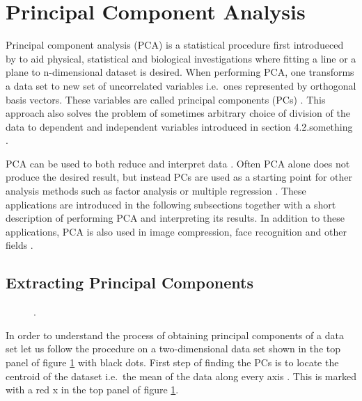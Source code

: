 \documentclass[english, oneside]{HYgradu}
\begin{document}


\section{Principal Component Analysis}
\reversemarginpar
{}
Principal component analysis (PCA) is a statistical procedure first introdueced by \citet{pearson1901lines} to aid physical, statistical and biological investigations where fitting a line or a plane to n-dimensional dataset is desired. When performing PCA, one transforms a data set to new set of uncorrelated variables i.e.\ ones represented by orthogonal basis vectors. These variables are called principal components (PCs) \citep{jolliffe2002principal}. This approach also solves the problem of sometimes arbitrary choice of division of the data to dependent and independent variables introduced in section 4.2.something \citet{pearson1901lines}. 

\reversemarginpar
{}
PCA can be used to both reduce and interpret data \citep{johnson2007applied}. Often PCA alone does not produce the desired result, but instead PCs are used as a starting point for other analysis methods such as factor analysis or multiple regression \citep{johnson2007applied}. These applications are introduced in the following subsections together with a short description of performing PCA and interpreting its results. In addition to  these applications, PCA is also used in image compression, face recognition and other fields \citep{smith2002tutorial}.

\subsection{Extracting Principal Components}
\begin{figure}
    \centering
    
    \caption{.}\label{fig:pca-illustrated}
\end{figure}

In order to understand the process of obtaining principal components of a data set let us follow the procedure on a two-dimensional data set shown in the top panel of figure \ref{fig:pca-illustrated} with black dots. First step of finding the PCs is to locate the centroid of the dataset i.e.\ the mean of the data along every axis \citep{smith2002tutorial}. This is marked with a red x in the top panel of figure \ref{fig:pca-illustrated}.
\end{document}

